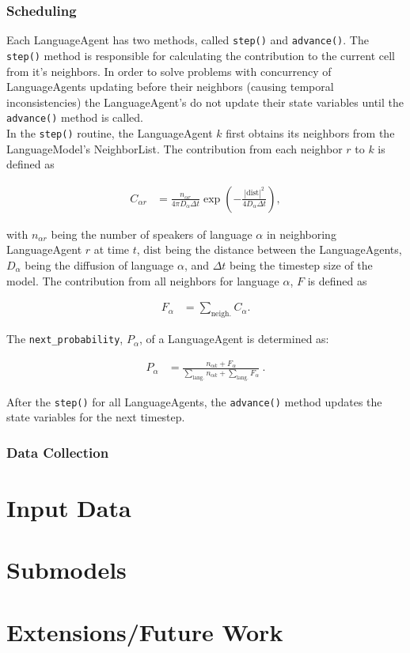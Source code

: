 \documentclass{article}
\begin{document}
\subsubsection{Scheduling}
Each LanguageAgent has two methods, called \texttt{step()} and \texttt{advance()}. The \texttt{step()} method is responsible for calculating the contribution to the current cell from it's neighbors. In order to solve problems with concurrency of LanguageAgents updating before their neighbors (causing temporal inconsistencies) the LanguageAgent's do not update their state variables until the \texttt{advance()} method is called.\\
In the \texttt{step()} routine, the LanguageAgent $k$ first obtains its neighbors from the LanguageModel's NeighborList. The contribution from each neighbor $r$ to $k$ is defined as

\begin{align}
	C_{\alpha r} &= \frac{n_{\alpha r}}{4\pi D_\alpha \Delta t} \exp \left( - \frac{|\text{dist}|^2}{4 D_\alpha \Delta t} \right),
\end{align}

with $n_{\alpha r} $ being the number of speakers of language $\alpha$ in neighboring LanguageAgent $r$ at time $t$, $\text{dist}$ being the distance between the LanguageAgents, $D_\alpha$ being the diffusion of language $\alpha$, and $\Delta t$ being the timestep size of the model. The contribution from all neighbors for language $\alpha$, $F$ is defined as

\begin{align}
	F_\alpha &= \sum_{\text{neigh.}} C_\alpha.
\end{align}

The \texttt{next\_probability}, $P_\alpha$, of a LanguageAgent is determined as:

\begin{align}
	P_\alpha &= \frac{n_{\alpha k} + F_\alpha}{\sum_{\text{lang.}} n_{\alpha k} + \sum_{\text{lang.}} F_{\alpha} } ~.
\end{align}

After the \texttt{step()} for all LanguageAgents, the \texttt{advance()} method updates the state variables for the next timestep.

\subsubsection{Data Collection}


\section{Input Data}

\section{Submodels}

\section{Extensions/Future Work}
\end{document}
